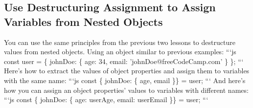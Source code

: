 \documentclass{article}%
\begin{document}
%
\subsection{Use Destructuring Assignment to Assign Variables from Nested Objects}%
\label{subsec:UseDestructuringAssignmenttoAssignVariablesfromNestedObjects}%
You can use the same principles from the previous two lessons to destructure values from nested objects.\newline%
Using an object similar to previous examples:\newline%
```js\newline%
const user = \{\newline%
  johnDoe: \{ \newline%
    age: 34,\newline%
    email: 'johnDoe@freeCodeCamp.com'\newline%
  \}\newline%
\};\newline%
```\newline%
Here's how to extract the values of object properties and assign them to variables with the same name:\newline%
```js\newline%
const \{ johnDoe: \{ age, email \}\} = user;\newline%
```\newline%
And here's how you can assign an object properties' values to variables with different names:\newline%
```js\newline%
const \{ johnDoe: \{ age: userAge, email: userEmail \}\} = user;\newline%
```\newline%

%
\end{document}
